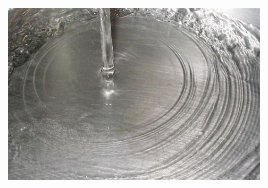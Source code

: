 \begin{frame}
\begin{minipage}{0.45\textwidth}
\begin{itemize}
\hspace{2cm}
\includegraphics[width=0.5\textwidth]{Resources/Images/faucet.jpeg} 
\end{itemize}
\end{minipage}
\end{frame}

\clearpage



